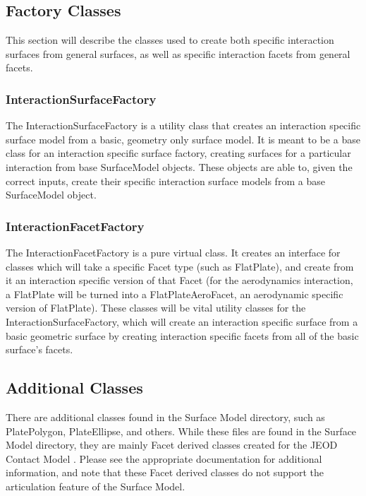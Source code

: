 \subsection{Factory Classes}

This section will describe the classes used to create
both specific interaction surfaces from general surfaces, as well as
specific interaction facets from general facets.

\subsubsection{InteractionSurfaceFactory}

The InteractionSurfaceFactory is a utility class that creates
an interaction specific surface model from a basic, geometry only
surface model. It is meant to be a base class for an interaction specific
surface factory, creating surfaces for a particular interaction from
base SurfaceModel objects. These objects are able to, given the correct
inputs, create their specific interaction surface models from a base
SurfaceModel object.

\subsubsection{InteractionFacetFactory}

The InteractionFacetFactory is a pure virtual class. It creates an interface
for classes which will take a specific Facet type (such as FlatPlate), and
create from it an interaction specific version of that Facet (for
the aerodynamics interaction, a FlatPlate will be turned into a 
FlatPlateAeroFacet, an aerodynamic specific version of FlatPlate).
These classes will be vital utility classes for the InteractionSurfaceFactory, which will create an interaction specific surface from a basic
geometric surface by creating interaction specific facets from
all of the basic surface's facets.

\subsection{Additional Classes}

There are additional classes found in the Surface Model directory, such as PlatePolygon, PlateEllipse, and others.
While these files are found in the Surface Model directory, they are mainly Facet derived classes
created for the JEOD Contact Model \cite{dynenv:CONTACT}. Please see the appropriate  documentation for additional
information, and note that these Facet derived classes do not support the articulation feature of the
Surface Model.

